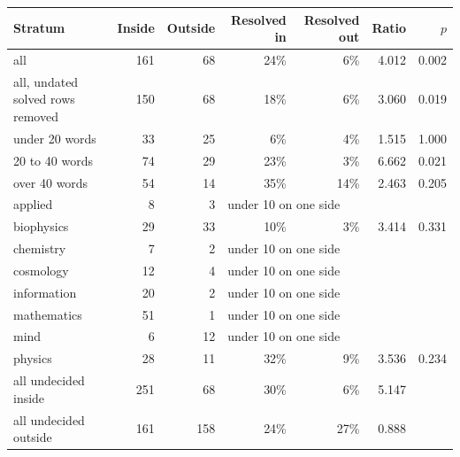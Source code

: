 \begin{tabular}{@{}lrrrrrr@{}}
\toprule
Stratum & Inside & Outside & Resolved in & Resolved out & Ratio & $p$ \\
\midrule
all & 161 & 68 & 24\% & 6\% & 4.012 & 0.002 \\
all, undated solved rows removed & 150 & 68 & 18\% & 6\% & 3.060 & 0.019 \\
under 20 words & 33 & 25 & 6\% & 4\% & 1.515 & 1.000 \\
20 to 40 words & 74 & 29 & 23\% & 3\% & 6.662 & 0.021 \\
over 40 words & 54 & 14 & 35\% & 14\% & 2.463 & 0.205 \\
applied & 8 & 3 & \multicolumn{4}{l}{under 10 on one side} \\
biophysics & 29 & 33 & 10\% & 3\% & 3.414 & 0.331 \\
chemistry & 7 & 2 & \multicolumn{4}{l}{under 10 on one side} \\
cosmology & 12 & 4 & \multicolumn{4}{l}{under 10 on one side} \\
information & 20 & 2 & \multicolumn{4}{l}{under 10 on one side} \\
mathematics & 51 & 1 & \multicolumn{4}{l}{under 10 on one side} \\
mind & 6 & 12 & \multicolumn{4}{l}{under 10 on one side} \\
physics & 28 & 11 & 32\% & 9\% & 3.536 & 0.234 \\
\midrule
all undecided inside & 251 & 68 & 30\% & 6\% & 5.147 & \\
all undecided outside & 161 & 158 & 24\% & 27\% & 0.888 & \\
\bottomrule
\end{tabular}
